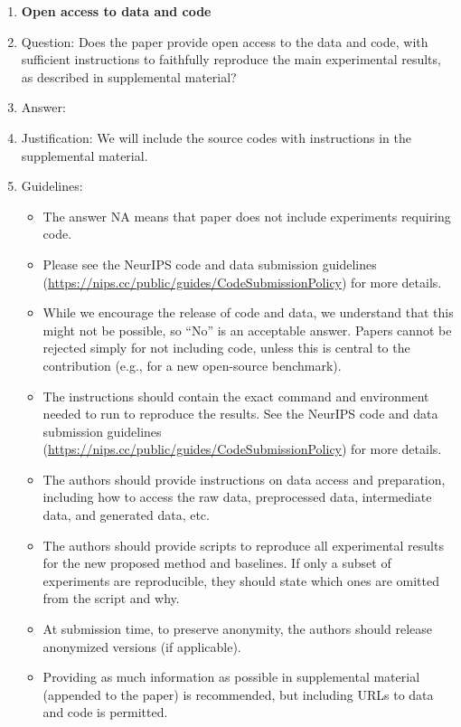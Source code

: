 \documentclass{article}
\theoremstyle{plain}
\theoremstyle{remark}
\begin{document}
\begin{enumerate}
\item {\bf Open access to data and code}
    \item[] Question: Does the paper provide open access to the data and code, with sufficient instructions to faithfully reproduce the main experimental results, as described in supplemental material?
    \item[] Answer: \answerYes{} %
    \item[] Justification: We will include the source codes with instructions in the supplemental material.
    \item[] Guidelines:
    \begin{itemize}
        \item The answer NA means that paper does not include experiments requiring code.
        \item Please see the NeurIPS code and data submission guidelines (\url{https://nips.cc/public/guides/CodeSubmissionPolicy}) for more details.
        \item While we encourage the release of code and data, we understand that this might not be possible, so “No” is an acceptable answer. Papers cannot be rejected simply for not including code, unless this is central to the contribution (e.g., for a new open-source benchmark).
        \item The instructions should contain the exact command and environment needed to run to reproduce the results. See the NeurIPS code and data submission guidelines (\url{https://nips.cc/public/guides/CodeSubmissionPolicy}) for more details.
        \item The authors should provide instructions on data access and preparation, including how to access the raw data, preprocessed data, intermediate data, and generated data, etc.
        \item The authors should provide scripts to reproduce all experimental results for the new proposed method and baselines. If only a subset of experiments are reproducible, they should state which ones are omitted from the script and why.
        \item At submission time, to preserve anonymity, the authors should release anonymized versions (if applicable).
        \item Providing as much information as possible in supplemental material (appended to the paper) is recommended, but including URLs to data and code is permitted.
    \end{itemize}



\end{enumerate}
\end{document}
